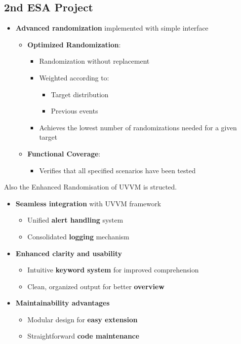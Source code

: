 \documentclass{article}
\begin{document}
\subsection{2nd ESA Project}
\begin{itemize}
    \item \textbf{Advanced randomization} implemented with simple interface
    
    \begin{itemize}
        \item \textbf{Optimized Randomization}:
        \begin{itemize}
            \item Randomization without replacement
            \item Weighted according to:
            \begin{itemize}
                \item Target distribution
                \item Previous events
            \end{itemize}
            \item Achieves the lowest number of randomizations needed for a given target
        \end{itemize}
        
        \item \textbf{Functional Coverage}:
        \begin{itemize}
            \item Verifies that all specified scenarios have been tested
        \end{itemize}
    \end{itemize}
\end{itemize}

Also the Enhanced Randomisation of UVVM is structed.

\begin{itemize}
    \item \textbf{Seamless integration} with UVVM framework
    \begin{itemize}
        \item Unified \textbf{alert handling} system
        \item Consolidated \textbf{logging} mechanism
    \end{itemize}
    
    \item \textbf{Enhanced clarity and usability}
    \begin{itemize}
        \item Intuitive \textbf{keyword system} for improved comprehension
        \item Clean, organized output for better \textbf{overview}
    \end{itemize}
    
    \item \textbf{Maintainability advantages}
    \begin{itemize}
        \item Modular design for \textbf{easy extension}
        \item Straightforward \textbf{code maintenance}
    \end{itemize}
\end{itemize}
\end{document}
